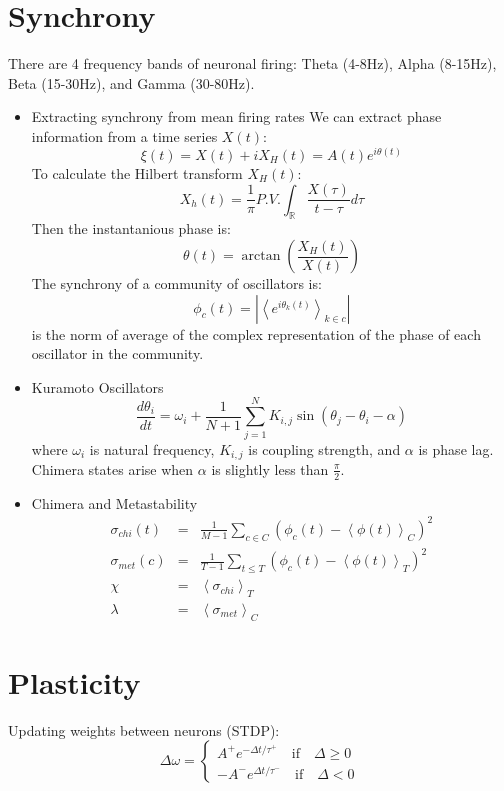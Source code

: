 \documentclass[a4paper,10pt]{article}
\begin{document}
\section{Synchrony}
There are 4 frequency bands of neuronal firing: Theta (4-8Hz), Alpha (8-15Hz), Beta (15-30Hz), and Gamma (30-80Hz). 
\begin{itemize}
  \item Extracting synchrony from mean firing rates
  We can extract phase information from a time series $X(t)$:
  $$
  \xi(t) = X(t) + iX_H(t) = A(t)e^{i\theta(t)}
  $$
  To calculate the Hilbert transform $X_H(t)$:
  $$
  X_h(t) = \frac{1}{\pi}P.V.\int_{\mathbb{R}}\frac{X(\tau)}{t - \tau}d\tau
  $$
  Then the instantanious phase is:
  $$
  \theta(t) = \arctan\left(\frac{X_H(t)}{X(t)}\right)
  $$
  The synchrony of a community of oscillators is:
  $$
  \phi_c(t) = \left|\left<e^{i\theta_k(t)}\right>_{k\in c}\right|
  $$
  is the norm of average of the complex representation of the phase of each oscillator in the community.
  \item Kuramoto Oscillators
  $$
  \frac{d\theta_i}{dt} = \omega_i + \frac{1}{N+1}\sum_{j=1}^N K_{i,j}\sin(\theta_j - \theta_i - \alpha)
  $$
  where $\omega_i$ is natural frequency, $K_{i,j}$ is coupling strength, and $\alpha$ is phase lag.  Chimera states arise when $\alpha$ is slightly less than $\frac{\pi}{2}$.
  \item Chimera and Metastability
  \begin{eqnarray*}
  \sigma_{chi}(t) &=& \frac{1}{M-1}\sum_{c\in C}(\phi_c(t) - \left<\phi(t)\right>_C)^2 \\
  \sigma_{met}(c) &=& \frac{1}{T-1}\sum_{t\leq T}(\phi_c(t) - \left<\phi(t)\right>_T)^2 \\
  \chi &=& \left<\sigma_{chi}\right>_T \\
  \lambda &=& \left<\sigma_{met}\right>_C
  \end{eqnarray*}
\end{itemize}

\section{Plasticity}
Updating weights between neurons (STDP):
$$
\Delta \omega = \left\{\begin{array}{l} A^{+}e^{-\Delta t/\tau^{+}}\quad \text{if}\quad \Delta\geq 0\\
                                       -A^{-}e^{ \Delta t/\tau^{-}}\quad \text{if}\quad \Delta< 0
                       \end{array}\right.
$$
\end{document}
